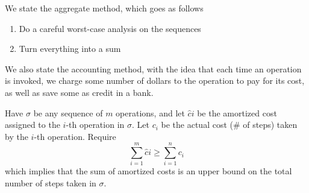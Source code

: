 We state the aggregate method, which goes as follows
\begin{enumerate}
\item Do a careful worst-case analysis on the sequences
\item Turn everything into a sum
\end{enumerate}

We also state the accounting method, with the idea that each time an operation is invoked, we charge some number of dollars to the operation to pay for its cost, as well as save some as credit in a bank.

Have $\sigma$ be any sequence of $m$ operations, and let $\hat{c}i$ be the amortized cost assigned to the $i$-th operation in $\sigma$. Let $c_i$ be the actual cost (\# of steps) taken by the $i$-th operation. Require
\[
\sum_{i=1}^m \hat{c}i \geq \sum_{i=1}^{n} c_i
\]
which implies that the sum of amortized costs is an upper bound on the total number of steps taken in $\sigma$.
